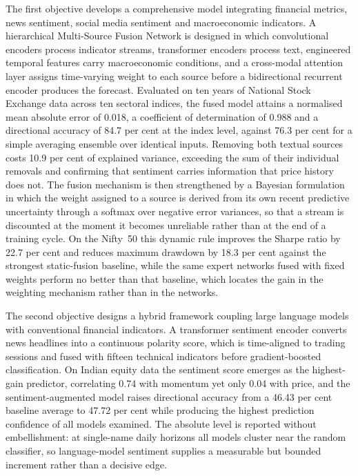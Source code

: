 The first objective develops a comprehensive model integrating financial metrics, news
sentiment, social media sentiment and macroeconomic indicators. A hierarchical
Multi-Source Fusion Network is designed in which convolutional encoders process indicator
streams, transformer encoders process text, engineered temporal features carry
macroeconomic conditions, and a cross-modal attention layer assigns time-varying weight to
each source before a bidirectional recurrent encoder produces the forecast. Evaluated on
ten years of National Stock Exchange data across ten sectoral indices, the fused model
attains a normalised mean absolute error of 0.018, a coefficient of determination of 0.988
and a directional accuracy of 84.7 per cent at the index level, against 76.3 per cent for
a simple averaging ensemble over identical inputs. Removing both textual sources costs
10.9 per cent of explained variance, exceeding the sum of their individual removals and
confirming that sentiment carries information that price history does not. The fusion
mechanism is then strengthened by a Bayesian formulation in which the weight assigned to a
source is derived from its own recent predictive uncertainty through a softmax over
negative error variances, so that a stream is discounted at the moment it becomes
unreliable rather than at the end of a training cycle. On the Nifty~50 this dynamic rule
improves the Sharpe ratio by 22.7 per cent and reduces maximum drawdown by 18.3 per cent
against the strongest static-fusion baseline, while the same expert networks fused with
fixed weights perform no better than that baseline, which locates the gain in the weighting
mechanism rather than in the networks.

The second objective designs a hybrid framework coupling large language models with
conventional financial indicators. A transformer sentiment encoder converts news headlines
into a continuous polarity score, which is time-aligned to trading sessions and fused with
fifteen technical indicators before gradient-boosted classification. On Indian equity data
the sentiment score emerges as the highest-gain predictor, correlating 0.74 with momentum
yet only 0.04 with price, and the sentiment-augmented model raises directional accuracy
from a 46.43 per cent baseline average to 47.72 per cent while producing the highest
prediction confidence of all models examined. The absolute level is reported without
embellishment: at single-name daily horizons all models cluster near the random classifier,
so language-model sentiment supplies a measurable but bounded increment rather than a
decisive edge.

